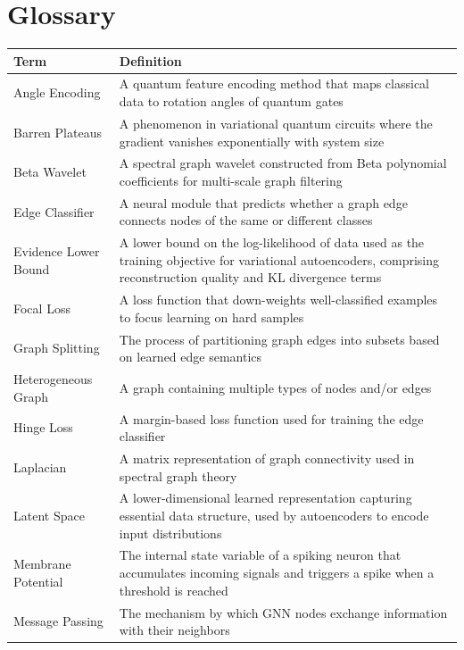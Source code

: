 \chapter*{Glossary}

\begin{table}[H]
\centering
\small
\begin{tabularx}{0.85\textwidth}{lL}
\toprule
\textbf{Term} & \textbf{Definition} \\
\midrule
Angle Encoding & A quantum feature encoding method that maps classical data to rotation angles of quantum gates \\
Barren Plateaus & A phenomenon in variational quantum circuits where the gradient vanishes exponentially with system size \\
Beta Wavelet & A spectral graph wavelet constructed from Beta polynomial coefficients for multi-scale graph filtering \\
Edge Classifier & A neural module that predicts whether a graph edge connects nodes of the same or different classes \\
Evidence Lower Bound & A lower bound on the log-likelihood of data used as the training objective for variational autoencoders, comprising reconstruction quality and KL divergence terms \\
Focal Loss & A loss function that down-weights well-classified examples to focus learning on hard samples \\
Graph Splitting & The process of partitioning graph edges into subsets based on learned edge semantics \\
Heterogeneous Graph & A graph containing multiple types of nodes and/or edges \\
Hinge Loss & A margin-based loss function used for training the edge classifier \\
Laplacian & A matrix representation of graph connectivity used in spectral graph theory \\
Latent Space & A lower-dimensional learned representation capturing essential data structure, used by autoencoders to encode input distributions \\
Membrane Potential & The internal state variable of a spiking neuron that accumulates incoming signals and triggers a spike when a threshold is reached \\
Message Passing & The mechanism by which GNN nodes exchange information with their neighbors \\

\end{tabularx}
\end{table}
